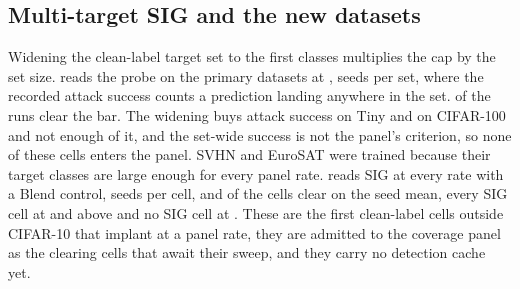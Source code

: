 \documentclass[../main.tex]{subfiles}
\begin{document}


\subsection{Multi-target SIG and the new datasets}

Widening the clean-label target set to the first \MultitargetSetSizes{} classes multiplies the cap by the set size.  reads the probe on the primary datasets at \PanelRateLow{}, \MultitargetSeeds{} seeds per set, where the recorded attack success counts a prediction landing anywhere in the set. \MultitargetRunsClearing{} of the \MultitargetRuns{} runs clear the bar. The widening buys attack success on Tiny and on CIFAR-100 and not enough of it, and the set-wide success is not the panel's criterion, so none of these cells enters the panel. SVHN and EuroSAT were trained because their target classes are large enough for every panel rate.  reads SIG at every rate with a Blend control, \NewDatasetSeeds{} seeds per cell, and \NewDatasetCellsClearingOnMean{} of the \NewDatasetCells{} cells clear on the seed mean, every SIG cell at \PanelRateMid{} and above and no SIG cell at \PanelRateLow{}. These are the first clean-label cells outside CIFAR-10 that implant at a panel rate, they are admitted to the coverage panel as the \PanelCellsAwaitingSweep{} clearing cells that await their sweep, and they carry no detection cache yet.



\end{document}
